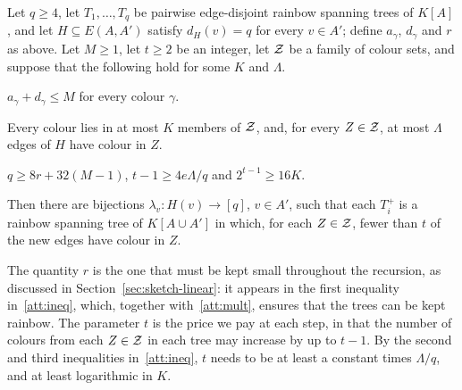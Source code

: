 \begin{lemma}\label{lem:attach}
Let $q\ge4$, let $T_1,\dots,T_q$ be pairwise edge-disjoint rainbow spanning trees of $K[A]$, and let $H\subseteq E(A,A')$ satisfy $d_H(v)=q$ for every $v\in A'$; define $a_\gamma$, $d_\gamma$ and $r$ as above.
Let $M\ge1$, let $t\geq 2$ be an integer, let $\mathcal{Z}$ be a family of colour sets, and suppose that the following hold for some $K$ and $\Lambda$.
\begin{props}
\item $a_\gamma+d_\gamma\le M$ for every colour $\gamma$.\label{att:mult}
\item Every colour lies in at most $K$ members of $\mathcal{Z}$, and, for every $Z\in\mathcal{Z}$, at most $\Lambda$ edges of $H$ have colour in $Z$.\label{att:Z}
\item $q\ge 8r+32(M-1)$, $t-1\ge 4e\Lambda/q$ and $2^{t-1}\ge16K$.\label{att:ineq}
\end{props}
Then there are bijections $\lambda_v:H(v)\to[q]$, $v\in A'$, such that each $T_i^+$ is a rainbow spanning tree of $K[A\cup A']$ in which, for each $Z\in\mathcal{Z}$, fewer than $t$ of the new edges have colour in $Z$.
\end{lemma}

The quantity $r$ is the one that must be kept small throughout the recursion, as discussed in Section~\ref{sec:sketch-linear}: it appears in the first inequality in~\ref{att:ineq}, which, together with~\ref{att:mult}, ensures that the trees can be kept rainbow.
The parameter $t$ is the price we pay at each step, in that the number of colours from each $Z\in\mathcal{Z}$ in each tree may increase by up to $t-1$. By the second and third inequalities in~\ref{att:ineq}, $t$ needs to be at least a constant times $\Lambda/q$, and at least logarithmic in $K$.

